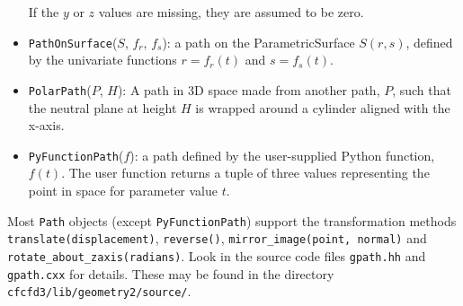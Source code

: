 \documentclass[12pt,a4paper,twoside]{article}
\begin{document}
\begin{itemize}
  If the $y$ or $z$ values are missing, they are assumed to be zero.
\item \texttt{PathOnSurface}($S$, $f_r$, $f_s$): a path on the
  ParametricSurface $S(r,s)$, defined by the univariate functions 
  $r=f_r(t)$ and $s=f_s(t)$.
\item \texttt{PolarPath}($P$, $H$): A path in 3D space made from another path, $P$,
  such that the neutral plane at height $H$ is wrapped around a cylinder aligned with
  the x-axis.
\item \texttt{PyFunctionPath}($f$): a path defined by the user-supplied Python function, $f(t)$.
  The user function returns a tuple of three values representing the point in space 
  for parameter value $t$.
\end{itemize}

Most \texttt{Path} objects (except \texttt{PyFunctionPath}) support the transformation methods
\texttt{translate(displacement)}, 
\texttt{reverse()}, 
\texttt{mirror\_image(point, normal)} and \\
\texttt{rotate\_about\_zaxis(radians)}.
Look in the source code files \texttt{gpath.hh} and \texttt{gpath.cxx} for details.
These may be found in the directory \texttt{cfcfd3/lib/geometry2/source/}.
\end{document}
